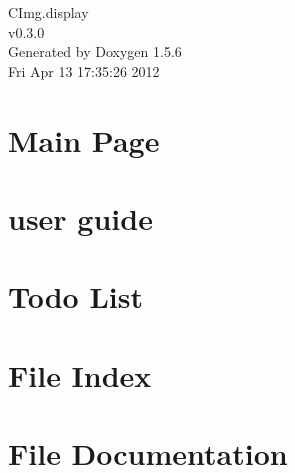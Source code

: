 \documentclass[a4paper]{book}
\begin{document}
\begin{titlepage}
\vspace*{7cm}
\begin{center}
{\Large CImg.display \\[1ex]\large v0.3.0 }\\
\vspace*{1cm}
{\large Generated by Doxygen 1.5.6}\\
\vspace*{0.5cm}
{\small Fri Apr 13 17:35:26 2012}\\
\end{center}
\end{titlepage}
\clearemptydoublepage
{}
\tableofcontents
\clearemptydoublepage
{}
\chapter{Main Page}
\label{index}\hypertarget{index}{}
\chapter{user guide}
\label{user}
\hypertarget{user}{}

\chapter{Todo List}
\label{todo}
\hypertarget{todo}{}

\chapter{File Index}

\chapter{File Documentation}

\printindex
\end{document}
